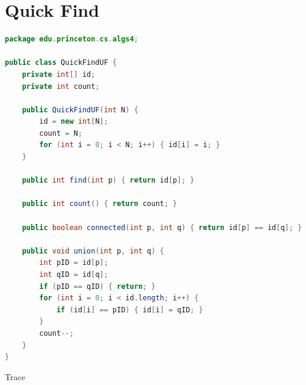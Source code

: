 \documentclass[8pt,a4paper,compress]{beamer}
\begin{document}
\section{Quick Find}
\begin{frame}[fragile]
\pause

\begin{lstlisting}[language=Java]
package edu.princeton.cs.algs4;

public class QuickFindUF {
    private int[] id;
    private int count;

    public QuickFindUF(int N) {
        id = new int[N];
        count = N;
        for (int i = 0; i < N; i++) { id[i] = i; }
    }

    public int find(int p) { return id[p]; }

    public int count() { return count; }
  
    public boolean connected(int p, int q) { return id[p] == id[q]; }

    public void union(int p, int q) {
        int pID = id[p];
        int qID = id[q];
        if (pID == qID) { return; }
        for (int i = 0; i < id.length; i++) {
            if (id[i] == pID) { id[i] = qID; }
        }
        count--;
    }
}
\end{lstlisting}
\end{frame}

\begin{frame}[fragile]
\pause

Trace

\begin{center}
\end{center}
\end{frame}
\end{document}
